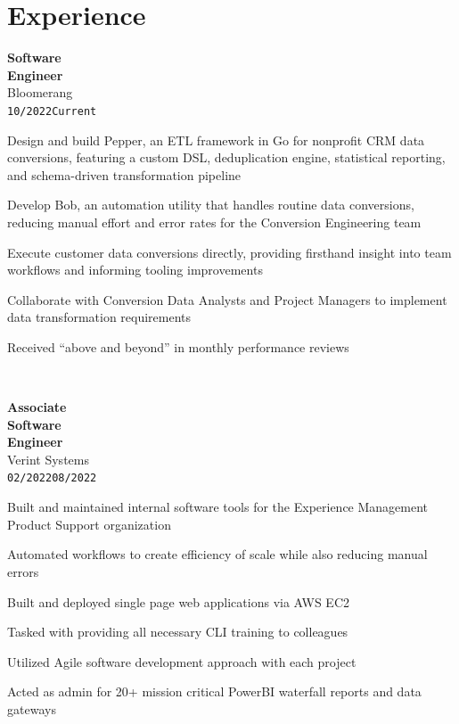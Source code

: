 \documentclass[15pt]{article}
\newenvironment{itemize*}%
  {\begin{itemize}[leftmargin=*,label=\faChevronRight]%
    \setlength{\itemsep}{0pt}%
    \setlength{\parskip}{0pt}%
    \setlength{\parsep}{0pt}}%
  {\end{itemize}}
\newcommand\workexp[5]{
    \begin{minipage}[t]{0.165\textwidth}
            \raggedleft
                \textbf{\fontsize{14}{12}\selectfont #1}\\ 
                #2\\
                \small\texttt{#3}\textendash \texttt{#4}
    \end{minipage}\hspace*{5pt}%
    \begin{minipage}[t]{0.8\textwidth}
        \raggedright
        \fontsize{13}{13}\selectfont#5
    \end{minipage}
}
\begin{document}
\section*{Experience}
\vspace*{-5pt}\workexp{Software\\ Engineer}{Bloomerang}{10/2022}{Current}{%
    \begin{itemize*}
        \item Design and build Pepper, an ETL framework in Go for nonprofit CRM data conversions, featuring a custom DSL, 
              deduplication engine, statistical reporting, and schema-driven transformation pipeline
        \item Develop Bob, an automation utility that handles routine data conversions, reducing manual effort and error 
              rates for the Conversion Engineering team
        \item Execute customer data conversions directly, providing firsthand insight into team workflows and informing tooling improvements
        \item Collaborate with Conversion Data Analysts and Project Managers to implement data transformation requirements
        \item Received ``above and beyond'' in monthly performance reviews
    \end{itemize*}%
}
\vspace*{10pt}\\
\workexp{Associate\\ Software\\ Engineer}{Verint Systems}{02/2022}{08/2022}{%
\begin{itemize*}
    \item Built and maintained internal software tools for the Experience Management Product Support organization
    \item Automated workflows to create efficiency of scale while also reducing manual errors
    \item Built and deployed single page web applications via AWS EC2
    \item Tasked with providing all necessary CLI training to colleagues
    \item Utilized Agile software development approach with each project
    \item Acted as admin for 20+ mission critical PowerBI waterfall reports and data gateways
\end{itemize*}%
}
\vspace*{10pt}\\
\end{document}
